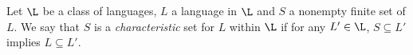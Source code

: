 

\begin{dfn}
    Let $\L$ be a class of languages, $L$ a language in $\L$ and
    $S$ a nonempty finite set of $L$.
    We say that $S$ is a \textit{characteristic} set for $L$ within $\L$
    if for any $L' \in \L$,
    $S \subseteq L'$ implies $L \subseteq L'$.
\end{dfn}

